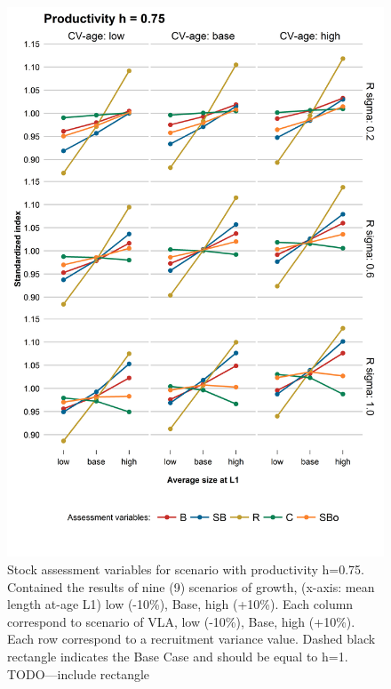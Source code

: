 \documentclass[11pt,letter,]{article}
\begin{document}
\begin{figure}[hbtp]
	\begin{center}
\includegraphics[width=0.70\columnwidth]{figures/steepness-75-estado.png}
  \end{center}
\caption{Stock assessment variables for scenario with productivity h=0.75. Contained the results of nine (9) scenarios of growth, (x-axis: mean length at-age L1) low (-10\%), Base, high (+10\%). Each column correspond to scenario of VLA, low (-10\%), Base, high (+10\%). Each row correspond to a recruitment variance value. Dashed black rectangle indicates the Base Case and should be equal to h=1. TODO---include rectangle}
\label{figure1}
\end{figure}
\end{document}
